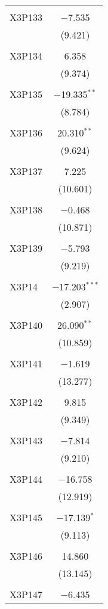 \begin{table}[!htbp]
\begin{tabular}{@{\extracolsep{5pt}}lc}
  & \\ 
 X3P133 & $-$7.535 \\ 
  & (9.421) \\ 
  & \\ 
 X3P134 & 6.358 \\ 
  & (9.374) \\ 
  & \\ 
 X3P135 & $-$19.335$^{**}$ \\ 
  & (8.784) \\ 
  & \\ 
 X3P136 & 20.310$^{**}$ \\ 
  & (9.624) \\ 
  & \\ 
 X3P137 & 7.225 \\ 
  & (10.601) \\ 
  & \\ 
 X3P138 & $-$0.468 \\ 
  & (10.871) \\ 
  & \\ 
 X3P139 & $-$5.793 \\ 
  & (9.219) \\ 
  & \\ 
 X3P14 & $-$17.203$^{***}$ \\ 
  & (2.907) \\ 
  & \\ 
 X3P140 & 26.090$^{**}$ \\ 
  & (10.859) \\ 
  & \\ 
 X3P141 & $-$1.619 \\ 
  & (13.277) \\ 
  & \\ 
 X3P142 & 9.815 \\ 
  & (9.349) \\ 
  & \\ 
 X3P143 & $-$7.814 \\ 
  & (9.210) \\ 
  & \\ 
 X3P144 & $-$16.758 \\ 
  & (12.919) \\ 
  & \\ 
 X3P145 & $-$17.139$^{*}$ \\ 
  & (9.113) \\ 
  & \\ 
 X3P146 & 14.860 \\ 
  & (13.145) \\ 
  & \\ 
 X3P147 & $-$6.435 \\ 

\end{tabular}
\end{table}
